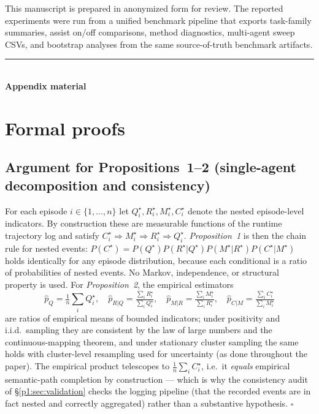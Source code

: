 \documentclass{article}
\begin{document}
\begin{ack}
This manuscript is prepared in anonymized form for review. The
reported experiments were run from a unified benchmark pipeline that
exports task-family summaries, assist on/off comparisons, method
diagnostics, multi-agent sweep CSVs, and bootstrap analyses from the
same source-of-truth benchmark artifacts.
\end{ack}

{\small

}

\FloatBarrier
\begin{center}\rule{0.55\linewidth}{0.4pt}\\[2pt]\textbf{Appendix material}\end{center}

\appendix

\section{Formal proofs}
\label{p1:app:proofs}

\subsection{Argument for Propositions~1--2 (single-agent decomposition and consistency)}

For each episode $i \in \{1,\dots,n\}$ let $Q_i^\star, R_i^\star, M_i^\star, C_i^\star$ denote the nested episode-level indicators. By construction these are measurable functions of the runtime trajectory log and satisfy $C_i^\star \Rightarrow M_i^\star \Rightarrow R_i^\star \Rightarrow Q_i^\star$. \emph{Proposition~1} is then the chain rule for nested events: $P(C^\star) = P(Q^\star)P(R^\star|Q^\star)P(M^\star|R^\star)P(C^\star|M^\star)$ holds identically for any episode distribution, because each conditional is a ratio of probabilities of nested events. No Markov, independence, or structural property is used. For \emph{Proposition~2}, the empirical estimators
\[
\hat p_Q = \tfrac{1}{n}\sum_i Q_i^\star,\quad
\hat p_{R|Q} = \tfrac{\sum_i R_i^\star}{\sum_i Q_i^\star},\quad
\hat p_{M|R} = \tfrac{\sum_i M_i^\star}{\sum_i R_i^\star},\quad
\hat p_{C|M} = \tfrac{\sum_i C_i^\star}{\sum_i M_i^\star}
\]
are ratios of empirical means of bounded indicators; under positivity and i.i.d.\ sampling they are consistent by the law of large numbers and the continuous-mapping theorem, and under stationary cluster sampling the same holds with cluster-level resampling used for uncertainty (as done throughout the paper). The empirical product telescopes to $\tfrac{1}{n}\sum_i C_i^\star$, i.e.\ it \emph{equals} empirical semantic-path completion by construction --- which is why the consistency audit of \S\ref{p1:sec:validation} checks the logging pipeline (that the recorded events are in fact nested and correctly aggregated) rather than a substantive hypothesis. \hfill$\square$
\end{document}
